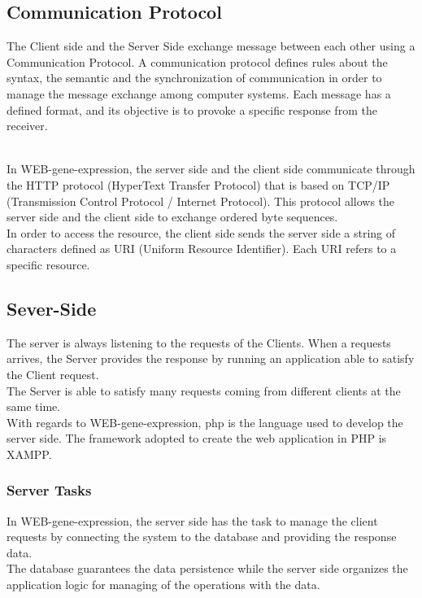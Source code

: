 \documentclass[a4paper]{report}
\begin{document}
\subsection{Communication Protocol}

The Client side and the Server Side exchange message between each other using a Communication Protocol. A communication protocol defines rules about the syntax, the semantic and the synchronization of communication in order to manage the message exchange among computer systems.  Each message has a defined format, and its objective is to provoke a specific response from the receiver.

\\In WEB-gene-expression, the server side and the client side communicate through the HTTP protocol (HyperText Transfer Protocol) that is based on TCP/IP (Transmission Control Protocol / Internet Protocol). This protocol allows the server side and the client side to exchange ordered byte sequences.
\\In order to access the resource, the client side sends the server side a string of characters defined as URI (Uniform Resource Identifier). Each URI refers to a specific resource.

\subsection{Sever-Side}\label{serverside}

The server is always listening to the requests of the Clients. When a requests arrives, the Server provides the response by running an application able to satisfy the Client request.\\
The Server is able to satisfy many requests coming from different clients at the same time.\\
With regards to WEB-gene-expression, php is the language used to develop the server side. The framework adopted to create the web application in PHP is XAMPP.


\subsubsection{Server Tasks} 
In WEB-gene-expression, the server side has the task to manage the client requests by connecting the system to the database and providing the response data. \\
The database guarantees the data persistence while the server side organizes the application logic for managing of the operations with the data.\\
\end{document}
